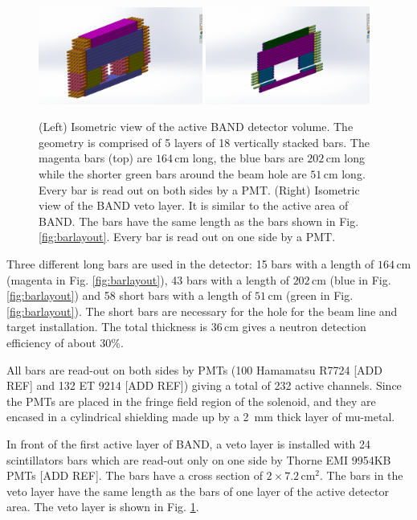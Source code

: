\documentclass[review]{elsarticle}
\begin{document}
\begin{figure}[htb]
\centering
\includegraphics[width=0.48\textwidth]{Band01.png}
  \includegraphics[width=0.48\textwidth]{BandVeto.png}
 \caption {(Left) Isometric view of the active BAND detector volume. The geometry is comprised of 5 layers of 18 vertically stacked bars. The magenta bars (top) are $164\,\mathrm{cm}$ long, the blue bars are $202\,\mathrm{cm}$ long while the shorter green bars around the beam hole are $51\,\mathrm{cm}$ long. Every bar is read out on both sides by a PMT. (Right) Isometric view of the BAND veto layer. It is similar to the active area of BAND. The bars have the same length as the bars shown in Fig. \ref{fig:barlayout}. Every bar is read out on one side by a PMT.}
  \label{fig:vetolayout}
\end{figure}
Three different long bars are used in the detector: 15 bars with a length of $164\,\mathrm{cm}$ (magenta in Fig. \ref{fig:barlayout}), 43 bars with a length of $202\,\mathrm{cm}$ (blue in Fig. \ref{fig:barlayout}) and 58 short bars with a length of $51\,\mathrm{cm}$ (green in Fig. \ref{fig:barlayout}). The short bars are necessary for the hole for the beam line and target installation. The total thickness is $36\,\mathrm{cm}$ gives a neutron detection efficiency of about 30\%.

All bars are read-out on both sides by PMTs (100 Hamamatsu R7724  [ADD REF] and 132 ET 9214  [ADD REF]) giving a total of 232 active channels. Since the PMTs are placed in the fringe field region of the solenoid, and they are encased in a cylindrical shielding made up by a \SI{2}{\milli\metre} thick layer of mu-metal.

In front of the first active layer of BAND, a veto layer is installed with 24 scintillators bars which are read-out only on one side by Thorne EMI 9954KB PMTs [ADD REF]. The bars have a cross section of $2 \times 7.2\,\mathrm{cm}^{2}$. The bars in the veto layer have the same length as the bars of one layer of the active detector area. The veto layer is shown in Fig. \ref{fig:vetolayout}.
\end{document}
